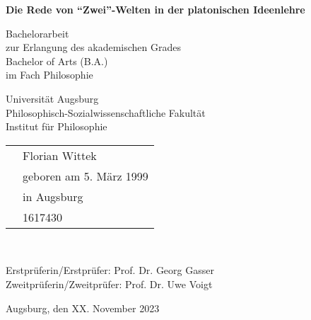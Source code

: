 \begin{titlepage}
	\begin{center}
		\vspace*{1cm}
		
		\textbf{\LARGE Die Rede von \enquote{Zwei}-Welten in der platonischen Ideenlehre}
		
		\vspace{0.5cm}
		\large
		
		Bachelorarbeit\\
		zur Erlangung des akademischen Grades\\
		Bachelor of Arts (B.A.)\\
		im Fach Philosophie\\
		\vspace {1.5cm}
	\end{center}
	\vspace{2.5cm}
	\raggedright
		Universität Augsburg\\
		Philosophisch-Sozialwissenschaftliche Fakultät\\
		Institut für Philosophie\\
		
		\vspace{1.5cm}
		
		\begin{tabular}{@{}ll}
			\makebox[2.5cm][l]{eingereicht von:} & \hspace{2cm} Florian Wittek\\
			& \hspace{2cm} geboren am 5. März 1999\\
			& \hspace{2cm} in Augsburg\\
			& \hspace{2cm} 1617430\\
		\end{tabular}\\	
		\vspace{1.5cm}

		Erstprüferin/Erstprüfer: \hspace{2cm} Prof. Dr. Georg Gasser\\
		Zweitprüferin/Zweitprüfer: \hspace{1.4cm} Prof. Dr. Uwe Voigt

		\vfill
		Augsburg, den \hspace{2.4cm} XX. November 2023
		
	
\end{titlepage}
